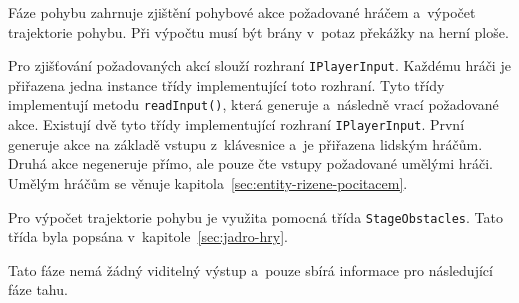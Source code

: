 Fáze pohybu zahrnuje zjištění pohybové akce požadované hráčem a~výpočet trajektorie pohybu. Při výpočtu musí být brány v~potaz překážky na herní ploše.

Pro zjišťování požadovaných akcí slouží rozhraní \texttt{IPlayerInput}. Každému hráči je přiřazena jedna instance třídy implementující toto rozhraní. Tyto třídy implementují metodu \texttt{readInput()}, která generuje a~následně vrací požadované akce. Existují dvě tyto třídy implementující rozhraní \texttt{IPlayerInput}. První generuje akce na základě vstupu z~klávesnice a~je přiřazena lidským hráčům. Druhá akce negeneruje přímo, ale pouze čte vstupy požadované umělými hráči. Umělým hráčům se věnuje kapitola~\ref{sec:entity-rizene-pocitacem}.

Pro výpočet trajektorie pohybu je využita pomocná třída \texttt{StageObstacles}. Tato třída byla popsána v~kapitole~\ref{sec:jadro-hry}.

Tato fáze nemá žádný viditelný výstup a~pouze sbírá informace pro následující fáze tahu.

